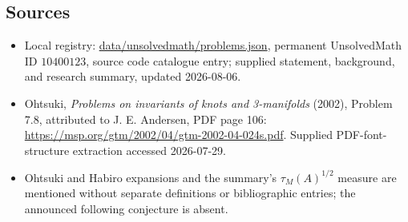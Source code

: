 \documentclass[11pt]{article}
\begin{document}
\subsection{Sources}
\begin{itemize}
\item Local registry: \url{data/unsolvedmath/problems.json}, permanent UnsolvedMath ID \(10400123\), source code catalogue entry; supplied statement, background, and research summary, updated 2026-08-06.
\item Ohtsuki, \emph{Problems on invariants of knots and 3-manifolds} (2002), Problem 7.8, attributed to J. E. Andersen, PDF page 106: \url{https://msp.org/gtm/2002/04/gtm-2002-04-024s.pdf}. Supplied PDF-font-structure extraction accessed 2026-07-29.
\item Ohtsuki and Habiro expansions and the summary's \(\tau_M(A)^{1/2}\) measure are mentioned without separate definitions or bibliographic entries; the announced following conjecture is absent.
\end{itemize}
\end{document}
